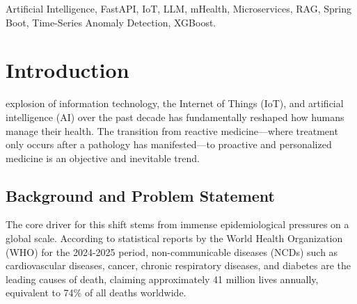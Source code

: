 \documentclass[journal, a4paper]{IEEEtran}
\begin{document}
\begin{abstract}
Trong kỷ nguyên y tế số, sự chuyển dịch từ y học phản ứng sang chăm sóc sức khỏe chủ động, cá nhân hóa là một tất yếu khách quan, được thúc đẩy bởi sự gia tăng của các bệnh mãn tính. Tuy nhiên, các ứng dụng mHealth hiện tại đối mặt với những hạn chế lớn, bao gồm dữ liệu phân tán (PGHD), thiếu tính cá nhân hóa và chưa tận dụng triệt để AI. Bài báo này trình bày toàn diện việc thiết kế, phát triển và đánh giá hệ thống "HealthCare Now". Nghiên cứu sử dụng Kiến trúc Microservices mạnh mẽ điều phối bốn miền cốt lõi thông qua Nginx, kết hợp Node.js, Spring Boot và FastAPI. Hệ thống áp dụng giao tiếp hướng sự kiện qua RabbitMQ và lưu trữ Polyglot Persistence với MongoDB và Redis. Về mặt phân tích, nền tảng áp dụng Học máy kết hợp: XGBoost cho dự đoán sinh lý động; LSTM Autoencoders để phát hiện bất thường chuỗi thời gian; CNN-LSTM cho số hóa OCR; và RAG kết hợp LLM để loại bỏ ảo giác trong tư vấn y tế. Kết quả đánh giá cho thấy kiến trúc ASGI dựa trên FastAPI vượt trội hơn hẳn các framework WSGI, đạt độ chính xác lâm sàng cao, khả năng mở rộng mạnh mẽ và khả năng xử lý thời gian thực xuất sắc.
\end{abstract}

\begin{IEEEkeywords}
Artificial Intelligence, FastAPI, IoT, LLM, mHealth, Microservices, RAG, Spring Boot, Time-Series Anomaly Detection, XGBoost.
\end{IEEEkeywords}

\section{Introduction}
\label{sec:introduction}

 explosion of information technology, the Internet of Things (IoT), and artificial intelligence (AI) over the past decade has fundamentally reshaped how humans manage their health. The transition from reactive medicine—where treatment only occurs after a pathology has manifested—to proactive and personalized medicine is an objective and inevitable trend.

\subsection{Background and Problem Statement}
The core driver for this shift stems from immense epidemiological pressures on a global scale. According to statistical reports by the World Health Organization (WHO) for the 2024-2025 period, non-communicable diseases (NCDs) such as cardiovascular diseases, cancer, chronic respiratory diseases, and diabetes are the leading causes of death, claiming approximately 41 million lives annually, equivalent to 74\% of all deaths worldwide.
\end{document}
